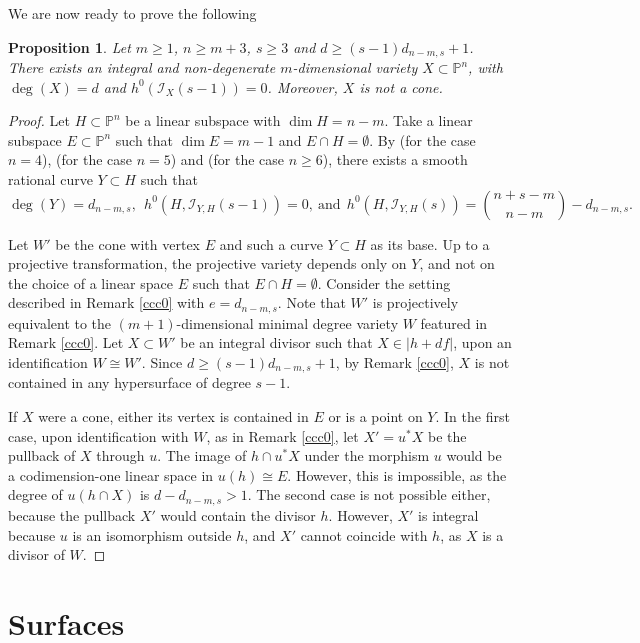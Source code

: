 \documentclass[a4, 11pt]{amsart}
\theoremstyle{plain}
\newtheorem{proposition}[theorem]{Proposition}
\theoremstyle{definition}
\newcommand{\enm}[1]{\ensuremath{#1}}          %
\newcommand{\cal}[1]{\mathcal{#1}}
\newcommand{\PP}{\enm{\mathbb{P}}}
\newcommand{\Ii}{\enm{\cal{I}}}
\begin{document}
We are now ready to prove the following


\begin{proposition}\label{ccc1}
Let $m\ge 1$, $n\ge m+3$, $s\ge 3$ and $d\ge (s-1)d_{n-m,s}+1$. There exists an integral and non-degenerate
$m$-dimensional variety $X\subset \PP^n$, with $\deg (X)=d$ and $h^0(\Ii _X(s-1)) =0$. Moreover, $X$ is not
a cone.
\end{proposition}

\begin{proof}
Let $H\subset \PP^n$ be a linear subspace with $\dim H = n-m$. Take a linear subspace $E\subset \PP^n$ such that $\dim E =m-1$
and $E\cap H=\emptyset$. By \cite{hi, be2} (for the case $n=4$), \cite{be2} (for the case $n=5$) and \cite{be3} (for the case $n\ge 6$), there exists a smooth rational curve $Y\subset H$ such that 
\[
\deg (Y) =d_{n-m,s},\ \ h^0(H,\Ii _{Y,H}(s-1)) =0,\ \mbox{and} \ \ h^0(H,\Ii _{Y,H}(s)) = \binom{n+s-m}{n-m} -d_{n-m,s}.
\]

Let $W'$ be the cone with vertex $E$ and such a curve $Y\subset H$ as its base. Up to a projective transformation, the
projective variety depends only on $Y$, and not on the choice of a linear space $E$ such that $E\cap H = \emptyset$. 
Consider the setting described in Remark \ref{ccc0} with $e =d_{n-m,s}$. Note that $W'$ is projectively equivalent to the $(m+1)$-dimensional minimal degree variety $W$ featured in Remark \ref{ccc0}. Let $X\subset W'$ be an integral divisor such that $X\in |h+df|$, upon an identification $W\cong W'$. Since $d\geq (s-1)d_{n-m,s}+1$, by Remark \ref{ccc0}, $X$ is not contained in any hypersurface of degree $s-1$. 

If $X$ were a cone, either its vertex is contained in $E$ or is a point on $Y$. In the first case, upon identification with $W$, as in Remark \ref{ccc0}, let $X'=u^{*}X$ be the pullback of $X$ through $u$. The image of $h\cap u^{*}X$ under the morphism $u$ would be a codimension-one linear space in $u(h)\cong E$. However, this is impossible, as the degree of $u(h\cap X)$ is $d-d_{n-m,s}>1$. 
The second case is not possible either, because the pullback $X'$ would contain the divisor $h$. However, $X'$ is integral because $u$ is an isomorphism outside $h$, and $X'$ cannot coincide with $h$, as $X$ is a divisor of $W$. 
\end{proof} 
 
 
 
\section{Surfaces}\label{surfaces}
\end{document}
